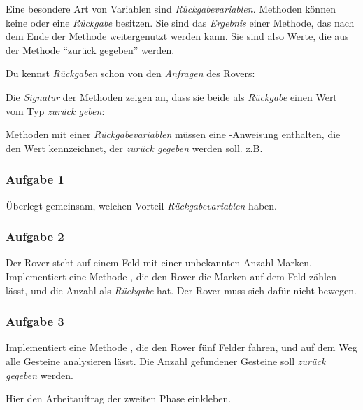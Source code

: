 \documentclass[10pt, a4paper]{scrartcl}
\begin{document}
\clearpage
\ReiheTitel[Rückgaben]

Eine besondere Art von Variablen sind \emph{Rückgabevariablen}. Methoden können keine oder eine \emph{Rückgabe} besitzen. Sie sind das \emph{Ergebnis} einer Methode, das nach dem Ende der Methode weitergenutzt werden kann. Sie sind also Werte, die aus der Methode \enquote{zurück gegeben} werden.

Du kennst \emph{Rückgaben} schon von den \emph{Anfragen} des Rovers:
\begin{smallitemize}
	\item {}
	\item {}
\end{smallitemize}

Die \emph{Signatur} der Methoden zeigen an, dass sie beide als \emph{Rückgabe} einen Wert vom Typ  \emph{zurück geben}: 

Methoden mit einer \emph{Rückgabevariablen} müssen eine -Anweisung enthalten, die den Wert kennzeichnet, der \emph{zurück gegeben} werden soll. z.B. 

\subsubsection*{Aufgabe 1}
Überlegt gemeinsam, welchen Vorteil \emph{Rückgabevariablen} haben.

\subsubsection*{Aufgabe 2}
Der Rover steht auf einem Feld mit einer unbekannten Anzahl Marken. Implementiert eine Methode , die den Rover die Marken auf dem Feld zählen lässt, und die Anzahl als \emph{Rückgabe} hat. Der Rover muss sich dafür nicht bewegen.


\subsubsection*{Aufgabe 3}
Implementiert eine Methode , die den Rover fünf Felder fahren, und auf dem Weg
alle Gesteine analysieren lässt. Die Anzahl gefundener Gesteine soll \emph{zurück gegeben} werden.

\vspace{2cm}
\begin{tcolorbox}[colframe=black!60,colback=black!10,width=\textwidth,height=5cm,center,boxrule=1pt]
\begin{center}
Hier den Arbeitauftrag der zweiten Phase einkleben.
\end{center}
\end{tcolorbox}
\end{document}
